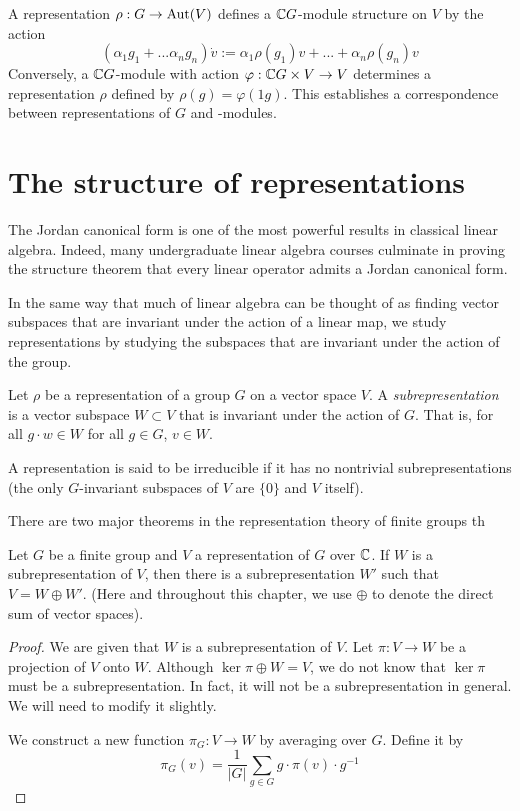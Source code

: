 A representation $\rho : G \rightarrow \operatorname{Aut}(V)$ defines a $\mathbb{C} G$-module structure on $V$ by the action
\[
    (\alpha_1g_1 + ... \alpha_ng_n) \dot v := \alpha_1\rho(g_1)v + ...+ \alpha_n\rho(g_n)v
\]
Conversely, a $\mathbb{C} G$-module with action $\varphi : \mathbb{C} G \times V \rightarrow V$ determines a representation $\rho$ 
defined by $\rho(g) = \varphi(1g)$. This establishes a correspondence between representations of $G$ and 
\CG-modules.


\section{The structure of representations}


The Jordan canonical form is one of the most powerful results in classical linear algebra. Indeed, many 
undergraduate linear algebra courses culminate in proving the structure theorem that every linear operator admits a 
Jordan canonical form. 


In the same way that much of linear algebra can be thought of as finding vector subspaces that are invariant under 
the action of a linear map, we study representations by studying the subspaces that are invariant under the action 
of the group.
\begin{definition}
    Let $\rho$ be a representation of a group $G$ on a vector space $V$. A \emph{subrepresentation} is a vector 
    subspace $W \subset V$ that is invariant under the action of $G$. That is, for all $g\cdot w \in W$ for all $g 
    \in G$, $v \in W$.
 

    A representation is said to be irreducible if it has no nontrivial subrepresentations (the only $G$-invariant 
    subspaces of $V$ are $\{ 0 \}$ and $V$ itself).
\end{definition}


There are two major theorems in the representation theory of finite groups th


\begin{theorem}
    Let $G$ be a finite group and $V$ a representation of $G$ over $\mathbb{C}$. If $W$ is a subrepresentation of $V$, then 
there is a subrepresentation $W'$ such that $V = W \oplus W'$. (Here and throughout this chapter, we use $\oplus$ 
to denote the direct sum of vector spaces).
\end{theorem}


\begin{proof}
    We are given that $W$ is a subrepresentation of $V$. Let $\pi : V \rightarrow W$ be a projection of $V$ onto 
    $W$. Although $\ker \pi \oplus W = V$, we do not know that $\ker \pi$ must be a subrepresentation. In fact, it 
    will not be a subrepresentation in general. We will need to modify it slightly.

    We construct a new function $\pi_G : V \rightarrow W$ by averaging over $G$. Define it by
    \[
        \pi_G(v) = \frac{1}{|G|}\sum_{g \in G} g \cdot \pi(v) \cdot g^{-1}
    \]
    
\end{proof}



